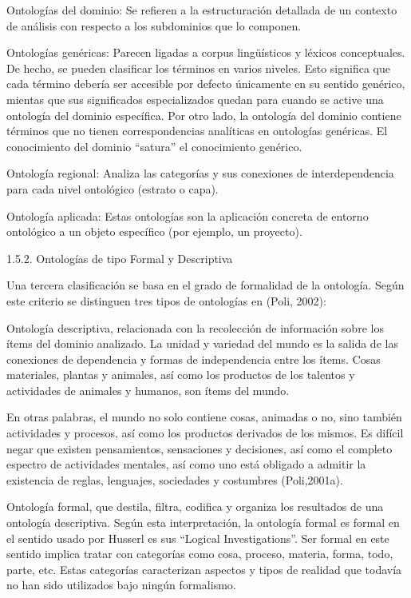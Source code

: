 Ontologías del dominio: Se refieren a la estructuración detallada de un contexto de análisis con respecto a los subdominios que lo componen. 

Ontologías genéricas: Parecen ligadas a corpus lingüísticos y léxicos conceptuales. De hecho, se pueden clasificar los términos en varios niveles. Esto significa que cada término debería ser accesible por defecto únicamente en su sentido genérico, mientas que sus significados especializados quedan para cuando se active una ontología del dominio específica. Por otro lado, la ontología del dominio contiene términos que no tienen correspondencias analíticas en ontologías genéricas. El conocimiento del dominio “satura” el conocimiento genérico.

Ontología regional: Analiza las categorías y sus conexiones de interdependencia para cada nivel ontológico (estrato o capa). 

Ontología aplicada: Estas ontologías son la aplicación concreta de entorno ontológico a un objeto específico (por ejemplo, un proyecto).

 1.5.2. Ontologías de tipo Formal y Descriptiva

Una tercera clasificación se basa en el grado de formalidad de la ontología. Según este criterio se distinguen tres tipos de ontologías en (Poli, 2002): 

Ontología descriptiva, relacionada con la recolección de información sobre los ítems del dominio analizado. La unidad y variedad del mundo es la salida de las conexiones de dependencia y formas de independencia entre los ítems. Cosas materiales, plantas y animales, así como los productos de los talentos y actividades de animales y humanos, son ítems del mundo. 

En otras palabras, el mundo no solo contiene cosas, animadas o no, sino también actividades y procesos, así como los productos derivados de los mismos. Es difícil negar que existen pensamientos, sensaciones y decisiones, así como el completo espectro de actividades mentales, así como uno está obligado a admitir la existencia de reglas, lenguajes, sociedades y costumbres (Poli,2001a).        

Ontología formal, que destila, filtra, codifica y organiza los resultados de una ontología descriptiva. Según esta interpretación, la ontología formal es formal en el sentido usado por Husserl es sus “Logical Investigations”. Ser formal en este sentido implica tratar con categorías como cosa, proceso, materia, forma, todo, parte, etc. Estas categorías caracterizan aspectos y tipos de realidad que todavía no han sido utilizados bajo ningún formalismo.        

